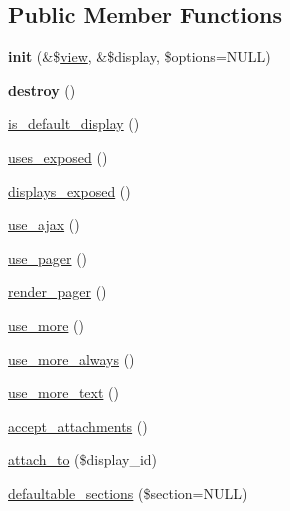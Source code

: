 \subsection*{Public Member Functions}
\begin{CompactItemize}
\item 
\hypertarget{classviews__plugin__display_354777723ab7573e8a4039259e447f7d}{
\textbf{init} (\&\$\hyperlink{classview}{view}, \&\$display, \$options=NULL)}
\label{classviews__plugin__display_354777723ab7573e8a4039259e447f7d}

\item 
\hypertarget{classviews__plugin__display_222ef7c9c8ed3c3d36517a719568cefe}{
\textbf{destroy} ()}
\label{classviews__plugin__display_222ef7c9c8ed3c3d36517a719568cefe}

\item 
\hyperlink{classviews__plugin__display_4f4562c1d689d8d3494b78d676249732}{is\_\-default\_\-display} ()
\item 
\hyperlink{classviews__plugin__display_5bfcb22187618f52bea9ea626aff18a4}{uses\_\-exposed} ()
\item 
\hyperlink{classviews__plugin__display_47058532874d0bc5448b53e0a98489cc}{displays\_\-exposed} ()
\item 
\hyperlink{classviews__plugin__display_7983d89c2a4aabab1df7ceb31d700a3c}{use\_\-ajax} ()
\item 
\hyperlink{classviews__plugin__display_aae358d9672426a81a1733a0236019b8}{use\_\-pager} ()
\item 
\hyperlink{classviews__plugin__display_0594f29620ea589280dee099666623c3}{render\_\-pager} ()
\item 
\hyperlink{classviews__plugin__display_e1d8ce3a491253cd56c5e8fc1d62c008}{use\_\-more} ()
\item 
\hyperlink{classviews__plugin__display_aa957375d149f787d53ba6b187dc35bf}{use\_\-more\_\-always} ()
\item 
\hyperlink{classviews__plugin__display_1681009bc05853c13f13e24ee94c2800}{use\_\-more\_\-text} ()
\item 
\hyperlink{classviews__plugin__display_f94245cf0dde1c883d9b3dc3760dbc9c}{accept\_\-attachments} ()
\item 
\hyperlink{classviews__plugin__display_a74683048bca4e740cb7e25ae4c527d4}{attach\_\-to} (\$display\_\-id)
\item 
\hyperlink{classviews__plugin__display_1ff9cd1b5762dde8765e608efdec8ec4}{defaultable\_\-sections} (\$section=NULL)
\item 

\end{CompactItemize}
